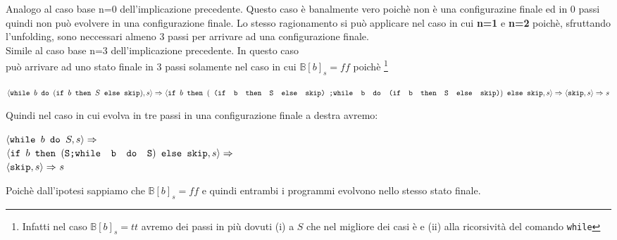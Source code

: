 {	 Analogo al caso base n=0 dell'implicazione precedente. Questo
	caso è banalmente vero poichè \exFourRS{} non è una configurazine finale ed
	in 0 passi quindi non può evolvere in una configurazione finale. Lo stesso
	ragionamento si può applicare nel caso in cui \textbf{n=1} e \textbf{n=2}
	poichè, sfruttando l'unfolding, sono neccessari almeno 3 passi per arrivare
	ad una configurazione finale.\\

	 Simile al caso base n=3 dell'implicazione precedente. In
	questo caso \\ \exFourRS{} può arrivare ad uno stato finale
	in 3 passi solamente nel caso in cui $\mathbb{B}[b]_s=ff$ poichè
	\footnote{Infatti nel caso $\mathbb{B}[b]_s=tt$ avremo dei passi in più 
	dovuti (i) a $S$ che nel migliore dei casi è \skipistr{} e (ii) alla
	ricorsività del comando \texttt{while}}
	\begin{center}
	$\exFourRS\Rar{}
	\confSs{
		\ifABC{b}
			{(\concat{
				(\ifABC{b}{S}{\skipistr})
			}{\wbS{b}{(\ifABC{b}{S}{\skipistr})}{}})}
			{\skipistr}
	}{s}\Rar{}
	\confSs{\skipistr}{s}\Rar{}s$
	\end{center}
	Quindi nel caso in cui \exFourRS{} evolva in tre passi in una
	configurazione finale a destra avremo:
	\begin{center}
	$\confSs{\wbS{b}{S}}{s}\Rar{}$\\
	$\confSs{
		\ifABC{b}{(\concat{S}{\wbS{b}{S}})}{\skipistr}
	}{s}\Rar{}$\\
	$\confSs{\skipistr}{s}\Rar{}s$
	\end{center}
	Poichè dall'ipotesi sappiamo che $\mathbb{B}[b]_s=ff$ e quindi entrambi i programmi evolvono nello stesso stato finale.\\

}
